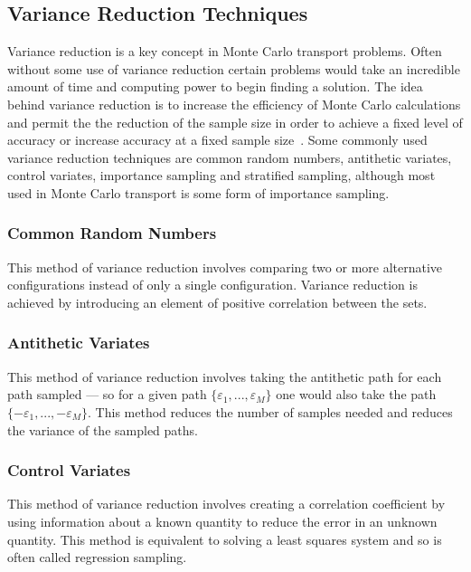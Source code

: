 \subsection{ \textbf{Variance Reduction Techniques} }

Variance reduction is a key concept in Monte Carlo transport problems.
%
Often without some use of variance reduction certain problems would take an incredible amount of time and computing power to begin finding a solution.
%
The idea behind variance reduction is to increase the efficiency of Monte Carlo calculations and permit the the reduction of the sample size in order to achieve a fixed level of accuracy or increase accuracy at a fixed sample size~\cite{kahn1953methods}.
%
Some commonly used variance reduction techniques are common random numbers, antithetic variates, control variates, importance sampling and stratified sampling, although most used in Monte Carlo transport is some form of importance sampling.
%

\subsubsection*{ \textbf{Common Random Numbers} } This method of variance reduction involves comparing two or more alternative configurations instead of only a single configuration. Variance reduction is achieved by introducing an element of positive correlation between the sets.~\cite{wikipediaVarReduction}

\subsubsection*{ \textbf{Antithetic Variates }} This method of variance reduction involves taking the antithetic path for each path sampled --- so for a given path $ \{ \varepsilon_1, ..., \varepsilon_M \}$ one would also take the path $ \{ -\varepsilon_1, ... , -\varepsilon_M  \} $. This method reduces the number of samples needed and reduces the variance of the sampled paths. ~\cite{wikipediaAntitheticVaraites}

\subsubsection*{\textbf{Control Variates }} This method of variance reduction involves creating a correlation coefficient by using information about a known quantity to reduce the error in an unknown quantity. This method is equivalent to solving a least squares system and so is often called regression sampling. ~\cite{wikipediaControlVaraites}

